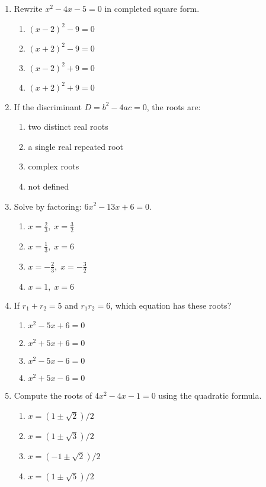 \documentclass[12pt]{article}
\begin{document}
\begin{enumerate}
\item Rewrite \(x^2 - 4x - 5 = 0\) in completed square form.

\begin{enumerate}
  \item \((x-2)^2 - 9 = 0\)
  \item \((x+2)^2 - 9 = 0\)
  \item \((x-2)^2 + 9 = 0\)
  \item \((x+2)^2 + 9 = 0\)
\end{enumerate}

\item If the discriminant \(D = b^2 - 4ac = 0\), the roots are:

\begin{enumerate}
  \item two distinct real roots
  \item a single real repeated root
  \item complex roots
  \item not defined
\end{enumerate}

\item Solve by factoring: \(6x^2 - 13x + 6 = 0\).

\begin{enumerate}
  \item \(x = \tfrac{2}{3}, \; x = \tfrac{3}{2}\)
  \item \(x = \tfrac{1}{3}, \; x = 6\)
  \item \(x = -\tfrac{2}{3}, \; x = -\tfrac{3}{2}\)
  \item \(x = 1, \; x = 6\)
\end{enumerate}

\item If \(r_1 + r_2 = 5\) and \(r_1 r_2 = 6\), which equation has these roots?

\begin{enumerate}
  \item \(x^2 - 5x + 6 = 0\)
  \item \(x^2 + 5x + 6 = 0\)
  \item \(x^2 - 5x - 6 = 0\)
  \item \(x^2 + 5x - 6 = 0\)
\end{enumerate}

\item Compute the roots of \(4x^2 - 4x - 1 = 0\) using the quadratic formula.

\begin{enumerate}
  \item \(x = (1 \pm \sqrt{2})/2\)
  \item \(x = (1 \pm \sqrt{3})/2\)
  \item \(x = (-1 \pm \sqrt{2})/2\)
  \item \(x = (1 \pm \sqrt{5})/2\)
\end{enumerate}


\end{enumerate}
\end{document}
